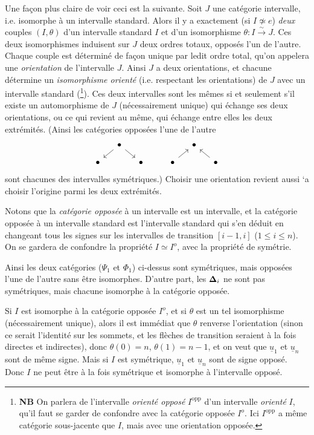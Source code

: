 Une façon plus claire de voir ceci est la suivante. Soit $J$ une catégorie intervalle, i.e. isomorphe à un intervalle standard. Alors il y a exactement (si $I \not\simeq e$) \textit{deux} couples $(I,\theta)$ d'un intervalle standard $I$ et d'un isomorphisme $\theta : I \xrightarrow{\sim} J$. Ces deux isomorphismes induisent sur $J$ deux ordres totaux, opposés l'un de l'autre. Chaque couple est déterminé de façon unique par ledit ordre total, qu'on appelera %
une \textit{orientation} de l'intervalle $J$. Ainsi $J$ a deux orientations, et chacune détermine un \textit{isomorphisme orienté} (i.e. respectant
les orientations) de $J$ avec un intervalle standard (\footnote[2]{\textbf{NB} On parlera de l'intervalle \textit{orienté opposé} $I^{\mathrm{opp}}$ d'un intervalle \textit{orienté} $I$, qu'il faut se garder de confondre avec la catégorie opposée $I^o$. Ici $I^{\mathrm{opp}}$ a même catégorie sous-jacente que $I$, mais avec une orientation opposée.}). Ces deux intervalles sont les mêmes si et seulement s'il existe un automorphisme de $J$ (nécessairement unique) qui échange ses deux orientations, ou ce qui revient au même, qui échange entre elles les deux extrémités. (Ainsi les catégories opposées l'une de l'autre
\[
\begin{tikzcd}[column sep=small, row sep=small]
 & \bullet \arrow[dl] \arrow[dr] & & & & \bullet & \\
 \bullet & & \bullet & & \bullet \arrow[ur] & & \bullet \arrow[ul]
\end{tikzcd}
\]
sont chacunes %
des intervalles symétriques.) Choisir une orientation revient aussi `a %
choisir l'origine parmi les deux extrémités.

Notons que la \textit{catégorie opposée} à un intervalle est un intervalle, et la catégorie opposée à un intervalle standard est l'intervalle standard qui s'en déduit en changeant tous les signes sur les intervalles de transition $[i-1,i]$ ($1 \leq i \leq n$). On se gardera de confondre la propriété $I \simeq I^o$, avec la propriété de symétrie.


Ainsi les deux catégories ($\Psi_1$ et $\Phi_1$) ci-dessus sont symétriques, mais opposées l'une de l'autre sans être isomorphes. D'autre part, les $\boldsymbol{\Delta}_i$ ne sont pas symétriques, mais chacune isomorphe à la catégorie opposée.

Si $I$ est isomorphe à la catégorie opposée $I^o$, et si $\theta$ est un tel isomorphisme (nécessairement unique), alors il est immédiat que $\theta$ renverse l'orientation (sinon ce serait l'identité sur les sommets, et les flèches de transition seraient à la fois directes et indirectes), donc $\theta(0) = n$, $\theta(1) = n-1$, et on veut que $\underline{u}_1$ et $\underline{u}_n$ sont de même signe. Mais si $I$ est symétrique, $\underline{u}_1$ et $\underline{u}_n$ sont de signe opposé. Donc $I$ ne peut être à la fois symétrique et isomorphe à l'intervalle opposé.

